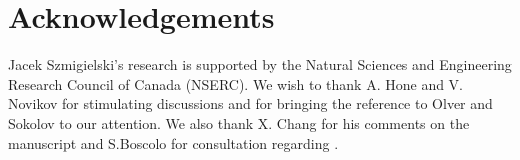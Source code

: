 \documentclass[10pt,a4paper]{article}
\numberwithin{equation}{section}
\theoremstyle{plain}
\theoremstyle{definition}
\begin{document}
   










%
%









%








%
%
\newpage
\section{Acknowledgements}

Jacek Szmigielski's research is supported by the Natural Sciences and Engineering Research Council of Canada (NSERC).   We wish to thank 
A. Hone and V. Novikov for stimulating discussions and for bringing the reference to Olver and Sokolov \cite{Olver-Sokolov:IS-associative} to our attention.  We also thank X. Chang for his comments on the manuscript and 
S.Boscolo for consultation regarding \cite{wu:PhysRev}.  
\end{document}
